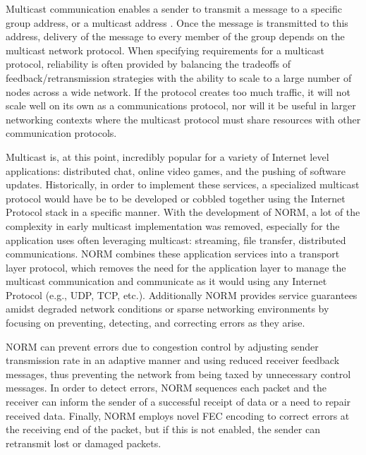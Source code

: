 \documentclass[10pt, journal]{IEEEtran}
\begin{document}
Multicast communication enables a sender to transmit a message to a specific group address, or a multicast address \cite{Lien2004}. Once the message is transmitted to this address, delivery of the message to every member of the group depends on the multicast network protocol. When specifying requirements for a multicast protocol, reliability is often provided by balancing the tradeoffs of feedback/retransmission strategies with the ability to scale to a large number of nodes across a wide network. If the protocol creates too much traffic, it will not scale well on its own as a communications protocol, nor will it be useful in larger networking contexts where the multicast protocol must share resources with other communication protocols.

Multicast is, at this point, incredibly popular for a variety of Internet level applications: distributed chat, online video games, and the pushing of software updates. Historically, in order to implement these services, a specialized multicast protocol would have be to be developed or cobbled together using the Internet Protocol stack in a specific manner. With the development of NORM, a lot of the complexity in early multicast implementation was removed, especially for the application uses often leveraging multicast: streaming, file transfer, distributed communications. NORM \cite{rfc5740} combines these application services into a transport layer protocol, which removes the need for the application layer to manage the multicast communication and communicate as it would using any Internet Protocol (e.g., UDP, TCP, etc.). Additionally NORM provides service guarantees amidst degraded network conditions or sparse networking environments by focusing on preventing, detecting, and correcting errors as they arise.

NORM can prevent errors due to congestion control by adjusting sender transmission rate in an adaptive manner and using reduced receiver feedback messages, thus preventing the network from being taxed by unnecessary control messages. In order to detect errors, NORM sequences each packet and the receiver can inform the sender of a successful receipt of data or a need to repair received data. Finally, NORM employs novel FEC encoding to correct errors at the receiving end of the packet, but if this is not enabled, the sender can retransmit lost or damaged packets.
\end{document}
